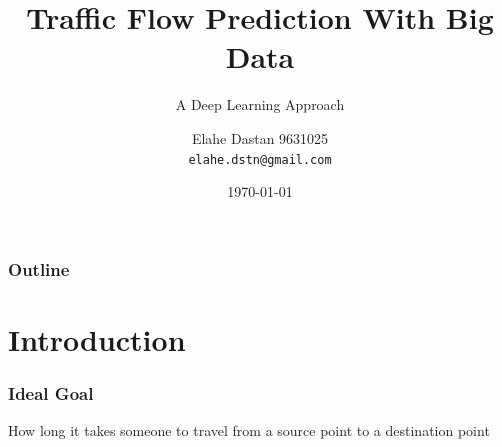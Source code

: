 \documentclass{beamer}
\author[Elahe Dastan]{%
  Elahe Dastan\hfill
  9631025\\
  \texttt{elahe.dstn@gmail.com}
}
\title{Traffic Flow Prediction With Big Data}
\subtitle{A Deep Learning Approach}
\institute[AUT]{Machine Learning\\Amirkabir University of Technology}
\date{\minimaldate\today}
\begin{document}
\begin{frame}
  \titlepage{}
\end{frame}
\begin{frame}
  \frametitle{Outline}
  \tableofcontents{}
\end{frame}

\section{Introduction}

\begin{frame}
  \frametitle{Ideal Goal}
  \begin{block}{}
    How long it takes someone to travel from a source point to a destination point
  \end{block}
\end{frame}
\end{document}

